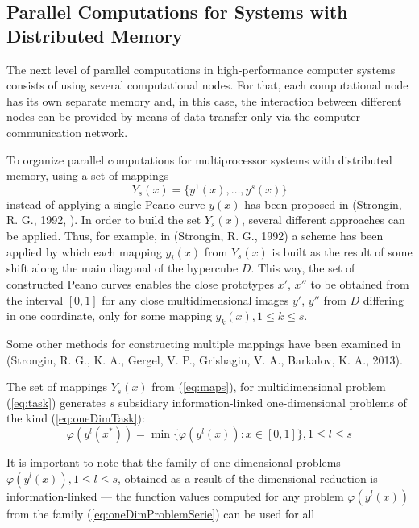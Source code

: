 \documentclass{gOMS2e}
\theoremstyle{plain}%
\theoremstyle{definition}
\theoremstyle{remark}
\begin{document}
\subsection{Parallel Computations for Systems with Distributed Memory}
\label{subsec:distribpar}
The next level of parallel computations in high-performance computer systems consists of
using several computational nodes. For that, each computational node has its own separate
memory and, in this case, the interaction between different nodes can be provided by
means of data transfer only via the computer communication network.
\par
To organize parallel computations for multiprocessor systems with distributed memory, using a set of mappings
\begin{equation}
  \label{eq:maps}
Y_s(x)=\{y^1(x),\dots,y^s(x)\}
\end{equation}
instead of applying a single Peano curve \(y(x)\) has been proposed in (Strongin, R. G., 1992, \cite{strSergGO}).
In order to build the set \(Y_s(x)\), several different approaches can be applied.
Thus, for example, in (Strongin, R. G., 1992) a scheme has been applied by which each
mapping \(y_i(x)\) from \(Y_s(x)\) is built as the result of some shift along the main
diagonal of the hypercube \(D\). This way, the set of constructed Peano curves enables the
close prototypes \(x'\), \(x''\)  to be obtained from the interval \([0,1]\) for any close
multidimensional images \(y'\), \(y''\) from \(D\) differing in one coordinate,
only for some mapping \(y_k(x), 1\leqslant k\leqslant s\).
\par
Some other methods for constructing multiple mappings have been examined in (Strongin, R. G., K. A., Gergel, V. P., Grishagin, V. A., Barkalov, K. A.,  2013).
\par
The set of mappings \(Y_s(x)\) from (\ref{eq:maps}), for multidimensional problem (\ref{eq:task})
generates \(s\) subsidiary information-linked one-dimensional problems of the kind (\ref{eq:oneDimTask}):
\begin{equation}
  \label{eq:oneDimProblemSerie}
  \varphi(y^l(x^*))=\min\{\varphi(y^l(x)):x\in [0,1]\},1\leqslant l\leqslant s
\end{equation}
\par
It is important to note that the family of one-dimensional problems \(\varphi(y^l(x)),1\leqslant l\leqslant s\),
obtained as a result of the dimensional reduction is information-linked --- the function
values computed for any problem \(\varphi(y^l(x))\) from the family (\ref{eq:oneDimProblemSerie}) can be used for all
\end{document}
